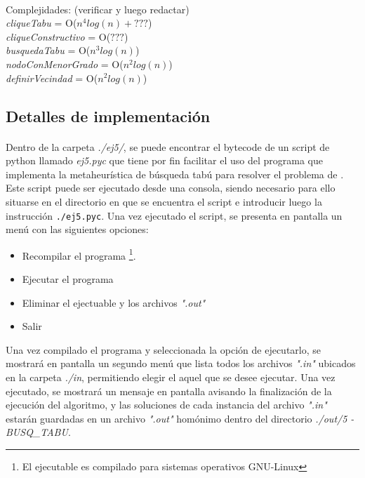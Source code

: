\paragraph{}
Complejidades: (verificar y luego redactar) \\
\textit{cliqueTabu} = O($n^4 log(n) + ???$) \\
\tab \textit{cliqueConstructivo} = O($???$) \\
\tab \textit{busquedaTabu} = O($n^3 log(n)$) \\
\tab \tab \textit{nodoConMenorGrado} = O($n^2 log(n)$) \\
\tab \tab \textit{definirVecindad} = O($n^2 log(n)$) \\

\subsection{Detalles de implementación}
\paragraph{}
Dentro de la carpeta \textit{./ej5/}, se puede encontrar el bytecode de un script de python llamado \textit{ej5.pyc} que tiene por fin facilitar el uso del programa que implementa la metaheurística de búsqueda tabú para resolver el problema de \mc . Este script puede ser ejecutado desde una consola, siendo necesario para ello situarse en el directorio en que se encuentra el script e introducir luego la instrucción \texttt{./ej5.pyc}. Una vez ejecutado el script, se presenta en pantalla un menú con las siguientes opciones:
\begin{itemize}
	\item[1] Recompilar el programa \footnote{El ejecutable es compilado para sistemas operativos GNU-Linux}.
	\item[2] Ejecutar el programa 
	\item[3] Eliminar el ejectuable y los archivos \textit{".out"}
	\item[4] Salir
\end{itemize}
Una vez compilado el programa y seleccionada la opción de ejecutarlo, se mostrará en pantalla un segundo menú que lista todos los archivos \textit{".in"} ubicados en la carpeta \textit{./in}, permitiendo elegir el aquel que se desee ejecutar. Una vez ejecutado, se mostrará un mensaje en pantalla avisando la finalización de la ejecución del algoritmo, y las soluciones de cada instancia del archivo \textit{".in"} estarán guardadas en un archivo \textit{".out"} homónimo  dentro del directorio \textit{./out/5 - BUSQ\_TABU}. \\

